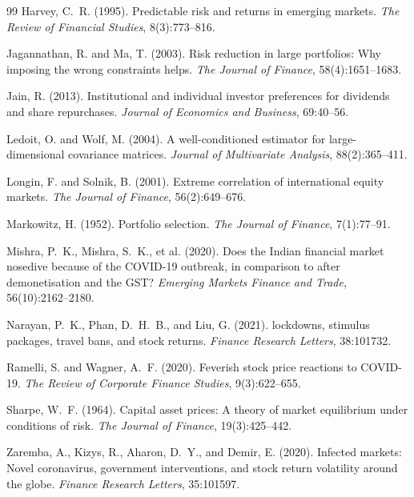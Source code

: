 \documentclass[12pt,a4paper]{article}
\begin{document}
\begin{thebibliography}{99}
Harvey, C.~R. (1995).
\newblock Predictable risk and returns in emerging markets.
\newblock \textit{The Review of Financial Studies}, 8(3):773--816.

Jagannathan, R. and Ma, T. (2003).
\newblock Risk reduction in large portfolios: Why imposing the wrong constraints helps.
\newblock \textit{The Journal of Finance}, 58(4):1651--1683.

Jain, R. (2013).
\newblock Institutional and individual investor preferences for dividends and share repurchases.
\newblock \textit{Journal of Economics and Business}, 69:40--56.

Ledoit, O. and Wolf, M. (2004).
\newblock A well-conditioned estimator for large-dimensional covariance matrices.
\newblock \textit{Journal of Multivariate Analysis}, 88(2):365--411.

Longin, F. and Solnik, B. (2001).
\newblock Extreme correlation of international equity markets.
\newblock \textit{The Journal of Finance}, 56(2):649--676.

Markowitz, H. (1952).
\newblock Portfolio selection.
\newblock \textit{The Journal of Finance}, 7(1):77--91.

Mishra, P.~K., Mishra, S.~K., et al. (2020).
\newblock Does the {Indian} financial market nosedive because of the {COVID-19} outbreak, in comparison to after demonetisation and the {GST}?
\newblock \textit{Emerging Markets Finance and Trade}, 56(10):2162--2180.

Narayan, P.~K., Phan, D.~H.~B., and Liu, G. (2021).
 lockdowns, stimulus packages, travel bans, and stock returns.
\newblock \textit{Finance Research Letters}, 38:101732.

Ramelli, S. and Wagner, A.~F. (2020).
\newblock Feverish stock price reactions to {COVID-19}.
\newblock \textit{The Review of Corporate Finance Studies}, 9(3):622--655.

Sharpe, W.~F. (1964).
\newblock Capital asset prices: A theory of market equilibrium under conditions of risk.
\newblock \textit{The Journal of Finance}, 19(3):425--442.

Zaremba, A., Kizys, R., Aharon, D.~Y., and Demir, E. (2020).
\newblock Infected markets: Novel coronavirus, government interventions, and stock return volatility around the globe.
\newblock \textit{Finance Research Letters}, 35:101597.

\end{thebibliography}
\end{document}
